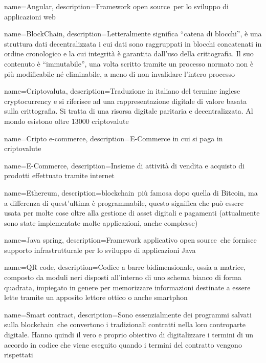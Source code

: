 {
	name={Angular},
	description={Framework open source\glo\ per lo sviluppo di applicazioni web}
}

{
	name={BlockChain},
	description={Letteralmente significa “catena di blocchi”, è una struttura dati decentralizzata i cui dati sono raggruppati in blocchi concatenati in ordine cronologico e la cui integrità è garantita dall’uso della crittografia. Il suo contenuto è “immutabile”, una volta scritto tramite un processo normato non è più modificabile né eliminabile, a meno di non invalidare l’intero processo}
}

{
	name={Criptovaluta},
	description={Traduzione in italiano del termine inglese cryptocurrency e si riferisce ad una rappresentazione digitale di valore basata sulla crittografia. Si tratta di una risorsa digitale paritaria e decentralizzata. Al mondo esistono oltre 13000 criptovalute\glo}
}

{
	name={Cripto e-commerce},
	description={E-Commerce in cui si paga in criptovalute\glo}
}

{
	name={E-Commerce},
	description={Insieme di attività di vendita e acquisto di prodotti effettuato tramite internet}
}

{
	name={Ethereum},
	description={blockchain\glo\ più famosa dopo quella di Bitcoin\glo, ma a differenza di quest’ultima è programmabile, questo significa che può essere usata per molte cose oltre alla gestione di asset digitali e pagamenti (attualmente sono state implementate molte applicazioni, anche complesse)}
}

{
	name={Java spring},
	description={Framework applicativo open source\glo\ che fornisce supporto infrastrutturale per lo sviluppo di applicazioni Java}
}

{
	name={QR code},
	description={Codice a barre bidimensionale, ossia a matrice, composto da moduli neri disposti all'interno di uno schema bianco di forma quadrata, impiegato in genere per memorizzare informazioni destinate a essere lette tramite un apposito lettore ottico o anche smartphon}
}

{
	name={Smart contract},
	description={Sono essenzialmente dei programmi salvati sulla blockchain\glo\ che convertono i tradizionali contratti nella loro controparte digitale. Hanno quindi il vero e proprio obiettivo di digitalizzare i termini di un accordo in codice che viene eseguito quando i termini del contratto vengono rispettati}
}

